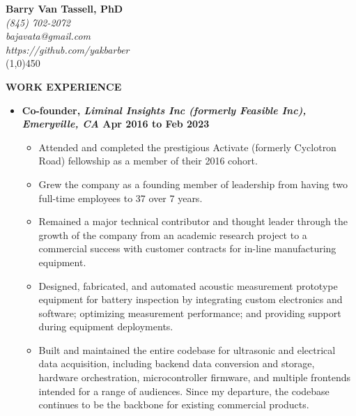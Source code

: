 \documentclass[9pt,letterpaper]{article}
\begin{document}

\begin{center}
  {\LARGE \textbf{Barry Van Tassell, PhD}}\\
  \emph{\small (845) 702-2072\\
    bajavata@gmail.com\\
    https://github.com/yakbarber}\\
  \line(1,0){450}
\end{center}

\onehalfspacing

{\singlespacing
\noindent \textbf{WORK EXPERIENCE}

{\small
\begin{itemize}
  \item \noindent \textbf{Co-founder, \emph{Liminal Insights Inc (formerly Feasible Inc), Emeryville, CA} \hfill {\scriptsize Apr 2016 to Feb 2023}} 
  {\footnotesize\begin{itemize}

        \item Attended and completed the prestigious Activate (formerly Cyclotron Road) fellowship as a member of their 2016 cohort.
        
        \item Grew the company as a founding member of leadership from having two full-time employees to 37 over 7 years.
        
        \item Remained a major technical contributor and thought leader through the growth of the company from an academic research project to a commercial success with customer contracts for in-line manufacturing equipment.

        
        \item Designed, fabricated, and automated acoustic measurement prototype equipment for battery inspection by integrating custom electronics and software; optimizing measurement performance; and providing support during equipment deployments.
        
        \item Built and maintained the entire codebase for ultrasonic and electrical data acquisition, including backend data conversion and storage, hardware orchestration, microcontroller firmware, and multiple frontends intended for a range of audiences. Since my departure, the codebase continues to be the backbone for existing commercial products.
        

\end{itemize}}
\end{itemize}}}
\end{document}
